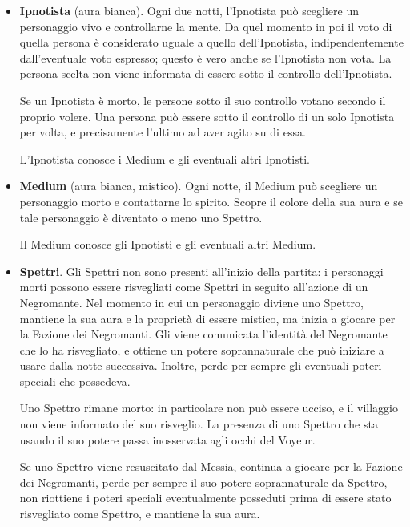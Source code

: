 \documentclass[a4paper,10pt]{article}
\begin{document}
\begin{itemize}
 \item {\bf Ipnotista} (aura bianca). Ogni due notti, l'Ipnotista può scegliere un personaggio vivo e controllarne la mente.
 Da quel momento in poi il voto di quella persona è considerato uguale a quello dell'Ipnotista, indipendentemente dall'eventuale voto espresso; questo è vero anche se l'Ipnotista non vota.
 La persona scelta non viene informata di essere sotto il controllo dell'Ipnotista.

 Se un Ipnotista è morto, le persone sotto il suo controllo votano secondo il proprio volere.
 Una persona può essere sotto il controllo di un solo Ipnotista per volta, e precisamente l'ultimo ad aver agito su di essa.

 L'Ipnotista conosce i Medium e gli eventuali altri Ipnotisti.

 \item {\bf Medium} (aura bianca, mistico). Ogni notte, il Medium può scegliere un personaggio morto e contattarne lo spirito. Scopre il colore della sua aura e se tale personaggio è diventato o meno uno Spettro.

 Il Medium conosce gli Ipnotisti e gli eventuali altri Medium.

 \item {\bf Spettri}. Gli Spettri non sono presenti all'inizio della partita: i personaggi morti possono essere risvegliati come Spettri in seguito all'azione di un Negromante.
 Nel momento in cui un personaggio diviene uno Spettro, mantiene la sua aura e la proprietà di essere mistico, ma inizia a giocare per la Fazione dei Negromanti. Gli viene comunicata l'identità del Negromante che lo ha risvegliato, e ottiene un potere soprannaturale che può iniziare a usare dalla notte successiva. Inoltre, perde per sempre gli eventuali poteri speciali che possedeva.
 
 Uno Spettro rimane morto: in particolare non può essere ucciso, e il villaggio non viene informato del suo risveglio.
 La presenza di uno Spettro che sta usando il suo potere passa inosservata agli occhi del Voyeur.
 
 Se uno Spettro viene resuscitato dal Messia, continua a giocare per la Fazione dei Negromanti, perde per sempre il suo potere soprannaturale da Spettro, non riottiene i poteri speciali eventualmente posseduti prima di essere stato risvegliato come Spettro, e mantiene la sua aura.
 
\end{itemize}
\end{document}
